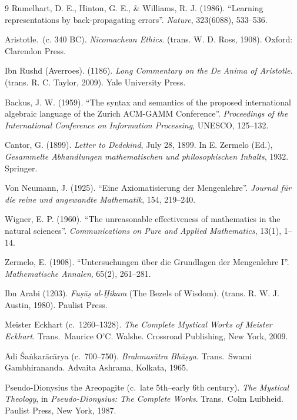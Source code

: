 \documentclass[11pt, a4paper]{article}
\theoremstyle{formalism}
\begin{document}
\begin{thebibliography}{9}
Rumelhart, D. E., Hinton, G. E., \& Williams, R. J. (1986). 
``Learning representations by back-propagating errors''. 
\textit{Nature}, 323(6088), 533--536.

Aristotle.\ (c. 340 BC). 
\textit{Nicomachean Ethics}. 
(trans. W. D. Ross, 1908). Oxford: Clarendon Press.

Ibn Rushd (Averroes). (1186). 
\textit{Long Commentary on the De Anima of Aristotle}. 
(trans. R. C. Taylor, 2009). Yale University Press.

Backus, J. W. (1959). 
``The syntax and semantics of the proposed international algebraic language of the Zurich ACM-GAMM Conference''. 
\textit{Proceedings of the International Conference on Information Processing}, UNESCO, 125--132.

Cantor, G. (1899). 
\textit{Letter to Dedekind}, July 28, 1899. 
In E. Zermelo (Ed.), \textit{Gesammelte Abhandlungen mathematischen und philosophischen Inhalts}, 1932. Springer.

Von Neumann, J. (1925). 
``Eine Axiomatisierung der Mengenlehre''. 
\textit{Journal f{\"u}r die reine und angewandte Mathematik}, 154, 219--240.

Wigner, E. P. (1960). 
``The unreasonable effectiveness of mathematics in the natural sciences''. 
\textit{Communications on Pure and Applied Mathematics}, 13(1), 1--14.

Zermelo, E. (1908). 
``Untersuchungen {\"u}ber die Grundlagen der Mengenlehre I''. 
\textit{Mathematische Annalen}, 65(2), 261--281.

Ibn Arabi (1203).
\textit{Fu\d{s}\=u\d{s} al-\d{H}ikam} (The Bezels of Wisdom).
(trans. R. W. J. Austin, 1980). Paulist Press.

Meister Eckhart (c.~1260--1328).
\textit{The Complete Mystical Works of Meister Eckhart}.
Trans.\ Maurice O'C. Walshe.
Crossroad Publishing, New York, 2009.

\=Adi \'Sa\.{n}kar\=ac\=arya (c.~700--750).
\textit{Brahmas\=utra Bh\=a\d{s}ya}.
Trans.\ Swami Gambhirananda.
Advaita Ashrama, Kolkata, 1965.

Pseudo-Dionysius the Areopagite (c.\ late 5th--early 6th century).
\textit{The Mystical Theology}, in \textit{Pseudo-Dionysius: The Complete
Works}.
Trans.\ Colm Luibheid.
Paulist Press, New York, 1987.

\end{thebibliography}
\end{document}
